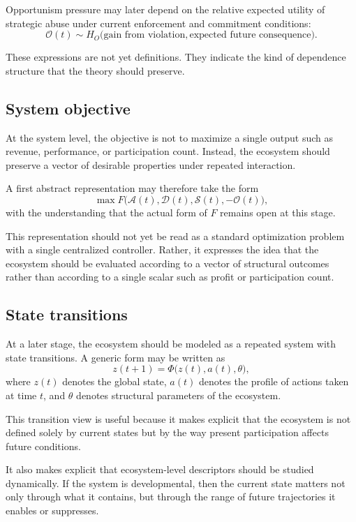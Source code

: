 \documentclass[11pt]{article}
\begin{document}
Opportunism pressure may later depend on the relative expected utility of strategic abuse under current enforcement and commitment conditions:
\[
\mathcal{O}(t) \sim H_O\big(\text{gain from violation}, \text{expected future consequence}\big).
\]

These expressions are not yet definitions. They indicate the kind of dependence structure that the theory should preserve.

\subsection{System objective}

At the system level, the objective is not to maximize a single output such as revenue, performance, or participation count. Instead, the ecosystem should preserve a vector of desirable properties under repeated interaction.

A first abstract representation may therefore take the form
\[
\max F\big(\mathcal{A}(t), \mathcal{D}(t), \mathcal{S}(t), -\mathcal{O}(t)\big),
\]
with the understanding that the actual form of \(F\) remains open at this stage.

This representation should not yet be read as a standard optimization problem with a single centralized controller. Rather, it expresses the idea that the ecosystem should be evaluated according to a vector of structural outcomes rather than according to a single scalar such as profit or participation count.

\subsection{State transitions}

At a later stage, the ecosystem should be modeled as a repeated system with state transitions. A generic form may be written as
\[
z(t+1) = \Phi\big(z(t), a(t), \theta\big),
\]
where \(z(t)\) denotes the global state, \(a(t)\) denotes the profile of actions taken at time \(t\), and \(\theta\) denotes structural parameters of the ecosystem.

This transition view is useful because it makes explicit that the ecosystem is not defined solely by current states but by the way present participation affects future conditions.

It also makes explicit that ecosystem-level descriptors should be studied dynamically. If the system is developmental, then the current state matters not only through what it contains, but through the range of future trajectories it enables or suppresses.
\end{document}

